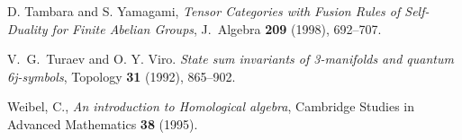 \documentclass{amsart}
\begin{document}
\begin{thebibliography}{0}


 D. Tambara and S. Yamagami, \emph{Tensor Categories with Fusion Rules of Self-Duality for Finite Abelian Groups}, J.\ Algebra \textbf{209} (1998), 692--707.



 V.\ G.\ Turaev and O. Y. Viro. {\em State sum invariants of 3-manifolds and quantum 6j-symbols}, Topology \textbf{31} (1992), 865--902.

 Weibel, C., {\em An introduction to Homological algebra}, Cambridge Studies in Advanced Mathematics \textbf{38} (1995).





\end{thebibliography}
\end{document}
